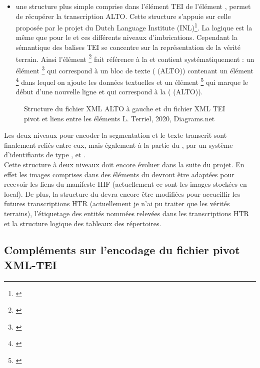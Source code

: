 \begin{itemize}
    \item une structure plus simple comprise dans l'élément TEI  de l'élément , permet de récupérer la transcription ALTO. Cette structure s'appuie sur celle proposée par le projet du Dutch Language Institute (INL)\footnote{\cite{dutch_language_institute_alto2tei_nodate}}. La logique est la même que pour le  et ces différents niveaux d'imbrications. Cependant la sémantique des balises TEI se concentre sur la représentation de la vérité terrain. Ainsi l'élément \footnote{\cite{tei_tei_nodate-11}} fait référence à la  et contient systématiquement : un élément \footnote{\cite{tei_tei_nodate-10}} qui correspond à un bloc de texte ( (ALTO)) contenant un élément \footnote{\cite{tei_tei_nodate-24}} dans lequel on ajoute les données textuelles et un élément \footnote{\cite{tei_tei_nodate-25}} qui marque le début d'une nouvelle ligne et qui correspond à la ( (ALTO)).
\end{itemize}

\begin{figure}[h!]
    \centering
    \centerline{}
    \caption{Structure du fichier XML ALTO à gauche et du fichier XML TEI pivot et liens entre les éléments \textcopyright L. Terriel, 2020, Diagrams.net}
    \label{fig:structure_arbre_tei_alto}
\end{figure}
\newpage
Les deux niveaux pour encoder la segmentation et le texte transcrit sont finalement reliés entre eux, mais également à la partie du , par un système d'identifiants de type ,  et .\\

Cette structure à deux niveaux doit encore évoluer dans la suite du projet. En effet les images comprises dans des éléments  du  devront être adaptées pour recevoir les liens du manifeste IIIF (actuellement ce sont les images stockées en local). De plus, la structure du  devra encore être modifiées pour accueillir les futures transcriptions HTR (actuellement je n'ai pu traiter que les vérités terrains), l'étiquetage des entités nommées relevées dans les transcriptions HTR et la structure logique des tableaux des répertoires.
\newpage
\subsection{Compléments sur l'encodage du fichier pivot XML-TEI}

